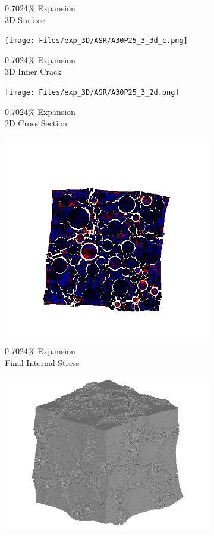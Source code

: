 \begin{figure}[ht!]
\begin{subfigure}{.25\textwidth}
      \caption{0.7024\% Expansion\\3D Surface}
    \end{subfigure}%
    \begin{subfigure}{.25\textwidth}
      \centering
      \texttt{[image: Files/exp\_3D/ASR/A30P25\_3\_3d\_c.png]}
      \caption{0.7024\% Expansion\\3D Inner Crack}
    \end{subfigure}%
    \begin{subfigure}{.25\textwidth}
      \centering
      \texttt{[image: Files/exp\_3D/ASR/A30P25\_3\_2d.png]}
      \caption{0.7024\% Expansion\\2D Cross Section}
    \end{subfigure}%
    \begin{subfigure}{.25\textwidth}
      \centering
      \includegraphics[width=.8\linewidth]{Files/exp_3D/ASR/A30P25_3_stress.png}
      \caption{0.7024\% Expansion\\Final Internal Stress}
    \end{subfigure}
    \begin{subfigure}{.25\textwidth}
      \centering
      \includegraphics[width=.8\linewidth]{Files/exp_3D/ASR/A30P25_4_3d.png}

\end{subfigure}
\end{figure}
